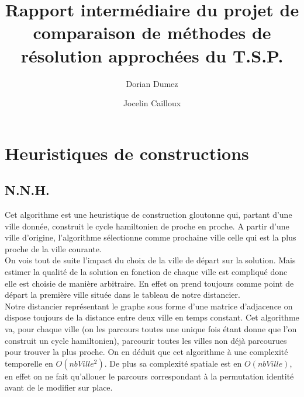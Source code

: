 \documentclass[12pt,a4paper]{article}
\title{Rapport intermédiaire du projet de comparaison de méthodes de résolution approchées du T.S.P.}
\author{Dorian Dumez \and Jocelin Cailloux}
\begin{document}
\maketitle
\section{Heuristiques de constructions}
\subsection{N.N.H.}
Cet algorithme est une heuristique de construction gloutonne qui, partant d'une ville donnée, construit le cycle hamiltonien de proche en proche. A partir d'une ville d'origine, l'algorithme sélectionne comme prochaine ville celle qui est la plus proche de la ville courante.\\
On vois tout de suite l'impact du choix de la ville de départ sur la solution. Mais estimer la qualité de la solution en fonction de chaque ville est compliqué donc elle est choisie de manière arbitraire. En effet on prend toujours comme point de départ la première ville située dans le tableau de notre distancier.\\
Notre distancier représentant le graphe sous forme d'une matrice d'adjacence on dispose toujours de la distance entre deux ville en temps constant. Cet algorithme va, pour chaque ville (on les parcours toutes une unique fois étant donne que l'on construit un cycle hamiltonien), parcourir toutes les villes non déjà parcourues pour trouver la plus proche. On en déduit que cet algorithme à une complexité temporelle en $O(nbVille^2)$. De plus sa complexité spatiale est en $O(nbVille)$, en effet on ne fait qu’allouer le parcours correspondant à la permutation identité avant de le modifier sur place.\\
\end{document}
